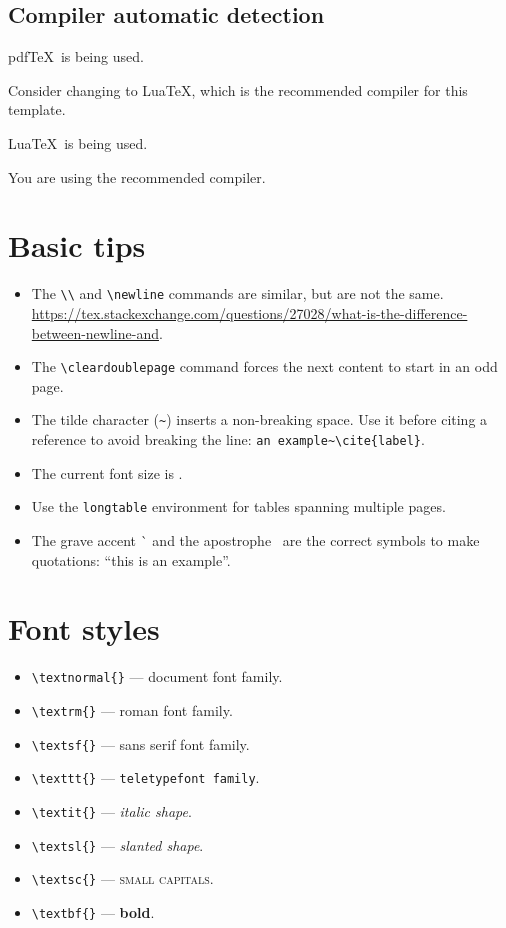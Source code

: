 \subsection{Compiler automatic detection}

\ifPDFTeX
{\color{red} pdf\TeX\ is being used.}

Consider changing to Lua\TeX, which is the recommended compiler for this template.
\fi

\ifLuaTeX
{\color{Green4} Lua\TeX\ is being used.}

You are using the recommended compiler.
\fi


\section{Basic tips}
\label{c2:s:basic-tips}

\begin{itemize}
\item
The \verb+\\+ and \verb+\newline+ commands are similar, but are not the same.\\
\url{https://tex.stackexchange.com/questions/27028/what-is-the-difference-between-newline-and}.
\item
The \verb+\cleardoublepage+ command forces the next content to start in an odd page.
\item
The tilde character (\verb+~+) inserts a non-breaking space.
Use it before citing a reference to avoid breaking the line: \verb+an example~\cite{label}+.
\item
The current font size is \myfontsize.
\item
Use the \verb+longtable+ environment for tables spanning multiple pages.
\item
The grave accent \`{} and the apostrophe \textquotesingle\ are the correct symbols to make quotations: ``this is an example''.
\end{itemize}


\section{Font styles}
\label{c2:s:font-styles}

\begin{itemize}
\item
\verb+\textnormal{}+ --- \textnormal{document font family}.
\item
\verb+\textrm{}+ --- \textrm{roman font family}.
\item
\verb+\textsf{}+ --- \textsf{sans serif font family}.
\item
\verb+\texttt{}+ --- \texttt{teletypefont family}.
\item
\verb+\textit{}+ --- \textit{italic shape}.
\item
\verb+\textsl{}+ --- \textsl{slanted shape}.
\item
\verb+\textsc{}+ --- \textsc{small capitals}.
\item
\verb+\textbf{}+ --- \textbf{bold}.
\end{itemize}


